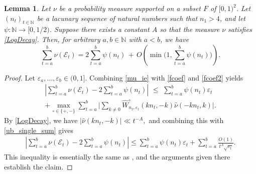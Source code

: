 \documentclass[12pt, reqno]{amsart}
\newtheorem{lemma}[thm]{Lemma}
\theoremstyle{definition}
\theoremstyle{remark}
\numberwithin{equation}{section}
\def\eps{\varepsilon}
\def\ls{\leqslant} \def\gs{\geqslant}
\def \bN {\mathbb N}
\def \cE {\mathcal E}
\begin{document}
\begin{lemma} \label{lem_sum_mu_good}
Let $\nu$ be a probability  measure supported on a subset $F$ of
$ [0,1)^2 $.  Let $  (n_t)_{t\in \bN} $ be a lacunary sequence of natural numbers such that $n_1 > 4$, and let $\psi:\mathbb{N}\rightarrow [0,1/2)$.
Suppose there exists a constant $A$ so that the measure $\nu$ satisfies \eqref{LogDecay}.
Then, for arbitrary $a,b \in \bN$ with $a < b$, we have
\begin{equation} \label{lem_sum_mu_good_result}
\sum_{t=a}^b\nu(\cE_t) = 2\sum_{t=a}^b\psi(n_t) \, + \, O\left( \min\Big(1,\sum_{t=a}^b\psi(n_t)\Big) \right).
\end{equation}
\end{lemma}

\begin{proof}
Let $\eps_a, \ldots, \eps_b \in (0,1].$
Combining \eqref{mu_ie} with \eqref{fcoef} and \eqref{fcoef2} yields
\begin{multline*}
\left| \sum_{t=a}^{b}\nu(\cE_t)  - 2\sum_{t=a}^b \psi(n_t) \right| \,\, \ls \,\, \sum_{t=a}^b \psi(n_t)\varepsilon_t \\
+  \max_{\circ \in \{+,-\}}
\sum_{t=a}^b\Big| 
\sum_{k\neq 0}
\widehat{W}_
{n_t,\varepsilon_t}^{\circ}
(kn_t,-k)\widehat{\nu}
(-kn_t, k) \Big|.
\end{multline*}
By \eqref{LogDecay}, we have 
$| \widehat{\nu}(kn_t, -k)|\ll t^{-A},$ and combining this with \eqref{ub_single_sum} gives
\begin{align*} 
\left| \sum_{t=a}^{b}\nu(\cE_t)  - 2\sum_{t=a}^b \psi(n_t) \right|
\ls \sum_{t=a}^b \psi(n_t)
\varepsilon_t + \sum_{t=a}^b\frac{O(1)}{t^{A}\sqrt{\varepsilon_t}}.
\end{align*}
This inequality is essentially the same as \cite[Equation (69)]{PVZZ2022}, and the arguments given there establish the claim. 
\end{proof}

\bigskip
\end{document}
